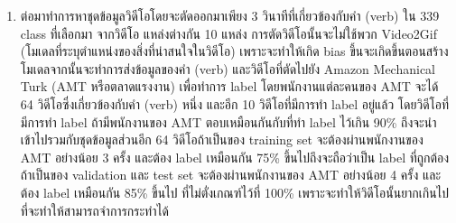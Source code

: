 \begin{enumerate}
\begin{enumerate}
\begin{enumerate}
	\item ต่อมาทำการหาชุดข้อมูลวิดีโอโดยจะตัดออกมาเพียง 3 วินาทีที่เกี่ยวข้องกับคำ (verb) ใน 339 class ที่เลือกมา จากวิดีโอ แหล่งต่างกัน 10 แหล่ง การตัดวิดีโอนั้นจะไม่ใช้พวก Video2Gif (โมเดลที่ระบุตำแหน่งของสิ่งที่น่าสนใจในวิดีโอ) เพราะจะทำให้เกิด bias ขึ้นจะเกิดขึ้นตอนสร้างโมเดลจากนั้นจะทำการส่งข้อมูลของคำ (verb) และวิดีโอที่ตัดไปยัง Amazon Mechanical Turk (AMT หรือตลาดแรงงาน) เพื่อทำการ label โดยพนักงานแต่ละคนของ AMT จะได้ 64 วิดีโอซึ่งเกี่ยวข้องกับคำ (verb) หนึ่ง และอีก 10 วิดีโอที่มีการทำ label อยู่แล้ว โดยวิดีโอที่มีการทำ label ถ้ามีพนักงานของ AMT ตอบเหมือนกันกับที่ทำ label ไว้เกิน 90\% ถึงจะนำเข้าไปรวมกับชุดข้อมูลส่วนอีก 64 วิดีโอถ้าเป็นของ training set จะต้องผ่านพนักงานของ AMT อย่างน้อย 3 ครั้ง และต้อง label เหมือนกัน 75\% ขึ้นไปถึงจะถือว่าเป็น label ที่ถูกต้อง ถ้าเป็นของ validation และ test set จะต้องผ่านพนักงานของ AMT อย่างน้อย 4 ครั้ง และต้อง label เหมือนกัน 85\% ขึ้นไป ที่ไม่ตั่งเกณฑ์ไว้ที่ 100\% เพราะจะทำให้วิดีโอนั้นยากเกินไปที่จะทำให้สามารถจำการกระทำได้	
\end{enumerate}
\end{enumerate}
\end{enumerate}		